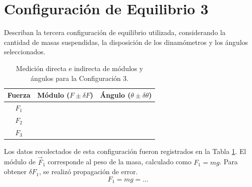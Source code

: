 \section{Configuración de Equilibrio 3}Describan la tercera configuración de equilibrio utilizada, considerando la cantidad de masas suspendidas, la disposición de los dinamómetros y los ángulos seleccionados.\begin{table}[h!]
\centering
\begin{tabular}{|c|c|c|}
\hline
\textbf{Fuerza} & \textbf{Módulo ($F \pm \delta F$)} & \textbf{Ángulo ($\theta \pm \delta \theta$)} \\ \hline
$F_1$ & & \\ \hline
$F_2$ & & \\ \hline
$F_3$ & & \\ \hline
\end{tabular}
\caption{Medición directa e indirecta de módulos y ángulos para la Configuración 3.}
\label{tab:config3-mediciones}
\end{table}Los datos recolectados de esta configuración fueron registrados en la Tabla \ref{tab:config3-mediciones}. El módulo de $\vec{F}_1$ corresponde al peso de la masa, calculado como $F_1 = mg$. Para obtener $\delta F_1$, se realizó propagación de error.
\begin{equation*}
F_1 = mg = \dots
\end{equation*}
